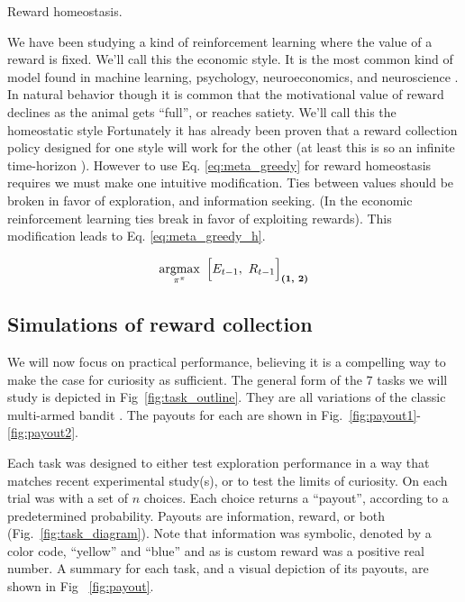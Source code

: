 \begin{featurebox}
	\caption{Reward homeostasis.}
	\label{box:complexity}
	We have been studying a kind of reinforcement learning where the value of a reward is fixed. We'll call this the economic style. It is the most common kind of model found in machine learning, psychology, neuroeconomics, and neuroscience \cite{Sutton2018}. In natural behavior though it is common that the motivational value of reward declines as the animal gets ``full'', or reaches satiety. We'll call this the homeostatic style \cite{Keramati2014,Juechems2019,Munch2020}
	Fortunately it has already been proven that a reward collection policy designed for one style will work for the other (at least this is so an infinite time-horizon \cite{Keramati2014}). However to use Eq. \ref{eq:meta_greedy} for reward homeostasis requires we must make one intuitive modification. Ties between values should be broken in favor of exploration, and information seeking. (In the economic reinforcement learning ties break in favor of exploiting rewards). This modification leads to Eq. \ref{eq:meta_greedy_h}.

	\begin{equation}
		\label{eq:meta_greedy_h} 
			\operatorname*{argmax}_{\pi^{\pi}} \ \Big [ E_{t-1},\ R_{t-1} \Big ]_{\textbf{(1, 2)}}
		\end{equation}
	\medskip
\end{featurebox}

\subsection{Simulations of reward collection} We will now focus on practical performance, believing it is a compelling way to make the case for curiosity as sufficient. The general form of the 7 tasks we will study is depicted in Fig~\ref{fig:task_outline}. They are all variations of the classic multi-armed bandit \cite{Sutton2018}. The payouts for each are shown in Fig.~\ref{fig:payout1}-\ref{fig:payout2}. 

Each task was designed to either test exploration performance in a way that matches recent experimental study(s), or to test the limits of curiosity. On each trial was with a set of $n$ choices. Each choice returns a “payout”, according to a predetermined probability. Payouts are information, reward, or both (Fig.~\ref{fig:task_diagram}). Note that information was symbolic, denoted by a color code, “yellow” and “blue” and as is custom reward was a positive real number. A summary for each task, and a visual depiction of its payouts, are shown in Fig ~\ref{fig:payout}.

